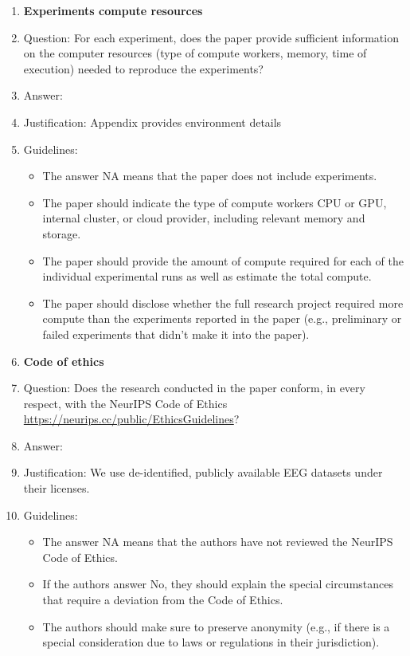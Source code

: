 \documentclass{article}
\begin{document}
\begin{enumerate}
\item {\bf Experiments compute resources}
    \item[] Question: For each experiment, does the paper provide sufficient information on the computer resources (type of compute workers, memory, time of execution) needed to reproduce the experiments?
    \item[] Answer: \answerYes{}
    \item[] Justification: Appendix provides environment details
    \item[] Guidelines:
    \begin{itemize}
        \item The answer NA means that the paper does not include experiments.
        \item The paper should indicate the type of compute workers CPU or GPU, internal cluster, or cloud provider, including relevant memory and storage.
        \item The paper should provide the amount of compute required for each of the individual experimental runs as well as estimate the total compute. 
        \item The paper should disclose whether the full research project required more compute than the experiments reported in the paper (e.g., preliminary or failed experiments that didn't make it into the paper). 
    \end{itemize}
    
\item {\bf Code of ethics}
    \item[] Question: Does the research conducted in the paper conform, in every respect, with the NeurIPS Code of Ethics \url{https://neurips.cc/public/EthicsGuidelines}?
    \item[] Answer: \answerYes{}
    \item[] Justification: We use de-identified, publicly available EEG datasets under their licenses.
    \item[] Guidelines:
    \begin{itemize}
        \item The answer NA means that the authors have not reviewed the NeurIPS Code of Ethics.
        \item If the authors answer No, they should explain the special circumstances that require a deviation from the Code of Ethics.
        \item The authors should make sure to preserve anonymity (e.g., if there is a special consideration due to laws or regulations in their jurisdiction).
    \end{itemize}



\end{enumerate}
\end{document}
